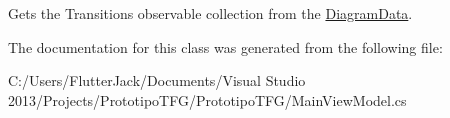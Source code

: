 Gets the Transitions observable collection from the \hyperlink{class_prototipo_t_f_g_1_1_diagram_data}{Diagram\+Data}. 



The documentation for this class was generated from the following file\+:\begin{DoxyCompactItemize}
\item 
C\+:/\+Users/\+Flutter\+Jack/\+Documents/\+Visual Studio 2013/\+Projects/\+Prototipo\+T\+F\+G/\+Prototipo\+T\+F\+G/Main\+View\+Model.\+cs\end{DoxyCompactItemize}
